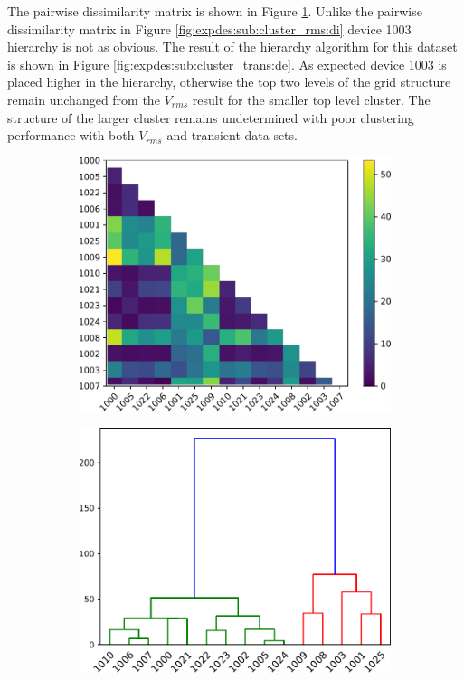 The pairwise dissimilarity matrix is shown in Figure \ref{fig:expdes:sub:cluster_trans:di}.
Unlike the pairwise dissimilarity matrix in Figure \ref{fig:expdes:sub:cluster_rms:di} device 1003 hierarchy is not as obvious.
The result of the hierarchy algorithm for this dataset is shown in Figure \ref{fig:expdes:sub:cluster_trans:de}.
As expected device 1003 is placed higher in the hierarchy, otherwise the top two levels of the grid structure remain unchanged from the $V_{rms}$ result for the smaller top level cluster.
The structure of the larger cluster remains undetermined with poor clustering performance with both $V_{rms}$ and transient data sets.
\begin{figure}[ht!]
    \centering
    \begin{subfigure}{0.45\textwidth}
        \centering
        \includegraphics[width=1\linewidth]{img/napali_eval/subthreshold/clustering/distance_trans.pdf}
        \caption{}
        \label{fig:expdes:sub:cluster_trans:di}
    \end{subfigure} \hspace{5mm}
    \begin{subfigure}{0.45\textwidth}
        \centering
        \includegraphics[width=1\linewidth]{img/napali_eval/subthreshold/clustering/dendrogram_trans.pdf}

\end{subfigure}
\end{figure}
